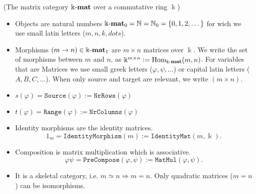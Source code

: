 \begin{example}{(The matrix category $\Bbbk\textnormal{-}\mathbf{mat}$ over a commutative ring $\Bbbk$)}\label{ex:kmat_skeletal}
\begin{itemize}
\item Objects are natural numbers $\Bbbk\textnormal{-}\mathbf{mat}_{0} = \mathbb{N} = \mathbb{N}_{0} = \{0,1,2,\dots\}$ for wich we use small latin letters
($m,n,k,dots$).
\item Morphisms $(m \rightarrow n) \in \Bbbk\textnormal{-}\mathbf{mat}_{1}$ are $m \times n$ matrices over $\Bbbk$.
We write the set of morphisms between $m$ and $n$, as $\Bbbk^{m\times n} := \textup{Hom}_{\Bbbk\textnormal{-}\mathbf{mat}}(m,n)$. 
For variables that are Matrices we use small greek letters ($\varphi, \psi,\dots$) or capital latin letters ($A, B, C,\dots$). When only source and target are relevant,
we write $(m \times n)$.
\item $s(\varphi) = \mathtt{Source}(\varphi) := \mathtt{NrRows}(\varphi)$
\item $t(\varphi) = \mathtt{Range}(\varphi) := \mathtt{NrColumns}(\varphi)$
\item Identity morphisms are the identity matrices.
\[
1_{m} = \mathtt{IdentityMorphism}(m) := \mathtt{IdentityMat}(m,\Bbbk).
\]
\item Composition is matrix multiplication which is associative.
\[
\varphi\psi = \mathtt{PreCompose}(\varphi,\psi) := \mathtt{MatMul}(\varphi,\psi).
\]
\item It is a skeletal category, i.e. $m \simeq n \Rightarrow m = n$. Only quadratic matrices ($m = n$) can be
isomorphisms.
\end{itemize}
\end{example}

